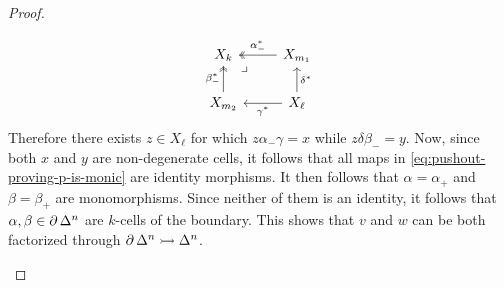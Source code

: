 \begin{proof}
\begin{itemize}
\begin{enumerate}[(i)]
                        \[
                            \begin{tikzcd}
                                X_k
                                \ar[dr, phantom, very near start, "\lrcorner"]
                                &X_{m_1} \ar[l, "\alpha_{-}^{*}"', two heads] \\
                                X_{m_2}
                                \ar[u, two heads, "\beta_{-}^{*}"]
                                &X_{\ell} \ar[l, "\gamma^{*}"]
                                \ar[u, "\delta^{*}"']
                            \end{tikzcd}
                        \]
                        Therefore there exists \(z \in X_{\ell}\) for which
                        \(z \alpha_{-} \gamma = x\) while \(z \delta \beta_{-} = y\). Now, since both
                        \(x\) and \(y\) are non-degenerate cells, it follows that all maps in
                        \cref{eq:pushout-proving-p-is-monic} are identity morphisms. It then follows
                        that \(\alpha = \alpha_{+}\) and \(\beta = \beta_{+}\) are
                        monomorphisms. Since neither of them is an identity, it follows that
                        \(\alpha, \beta \in \operatorname{\partial} \Delta^n\) are \(k\)-cells of the boundary. This shows
                        that \(v\) and \(w\) can be both factorized through
                        \(\operatorname{\partial} \Delta^n \rightarrowtail \Delta^n\).
              \end{enumerate}
    \end{itemize}
\end{proof}

